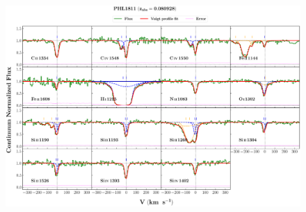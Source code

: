 \documentclass[12pt,draft]{report}
\begin{document}
\newpage

\begin{landscape}

\begin{figure}
    \centering
    \vspace{-20mm}
    \hspace*{-35mm}
    \includegraphics[width=1.25\linewidth]{System-Plots/PHL1811_z=0.080928_sys_plot.png}
\end{figure}

\end{landscape}
\end{document}
